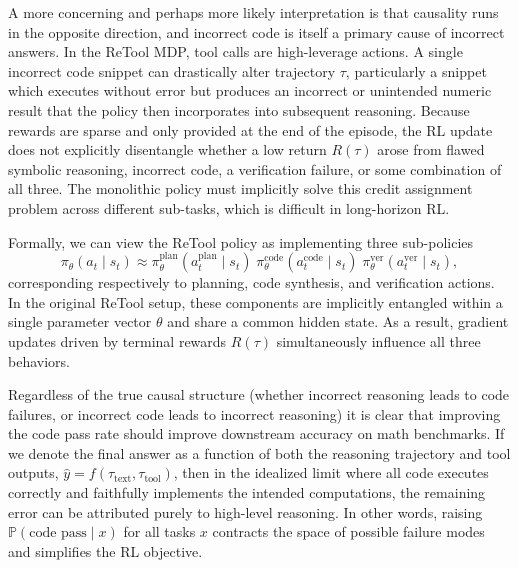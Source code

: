 \documentclass{article}
\begin{document}
A more concerning and perhaps more likely interpretation is that causality runs in the opposite direction, 
and incorrect code is itself a primary cause of incorrect answers. In the ReTool MDP, 
tool calls are high-leverage actions. A single incorrect code snippet can drastically 
alter trajectory $\tau$, particularly a snippet which executes without error but 
produces an incorrect or unintended numeric result that the policy then incorporates 
into subsequent reasoning. Because rewards are sparse and only provided at the end of 
the episode, the RL update does not explicitly disentangle whether a low return $R(\tau)$
arose from flawed symbolic reasoning, incorrect code, a verification failure, or 
some combination of all three. The monolithic policy must implicitly solve this 
credit assignment problem across different sub-tasks, which is 
difficult in long-horizon RL.

Formally, we can view the ReTool policy as implementing three sub-policies
\begin{equation}
  \pi_\theta(a_t \mid s_t) 
  \approx 
  \pi_\theta^{\text{plan}}(a_t^{\text{plan}} \mid s_t)
  \;\pi_\theta^{\text{code}}(a_t^{\text{code}} \mid s_t)
  \;\pi_\theta^{\text{ver}}(a_t^{\text{ver}} \mid s_t),
\end{equation}
corresponding respectively to planning, code synthesis, and verification actions. 
In the original ReTool setup, these components are implicitly entangled within a 
single parameter vector $\theta$ and share a common hidden state. As a result, 
gradient updates driven by terminal rewards $R(\tau)$ simultaneously influence 
all three behaviors.

Regardless of the true causal structure (whether incorrect reasoning leads 
to code failures, or incorrect code leads to incorrect reasoning) it is clear 
that improving the code pass rate should improve downstream 
accuracy on math benchmarks. If we denote the final answer as a function of 
both the reasoning trajectory and tool outputs, 
$\hat{y} = f(\tau_{\text{text}}, \tau_{\text{tool}})$, then in the idealized 
limit where all code executes correctly and faithfully implements the intended 
computations, the remaining error can be attributed purely to high-level 
reasoning. In other words, raising 
$\mathbb{P}(\text{code pass} \mid x)$ for all tasks $x$ contracts the space of 
possible failure modes and simplifies the RL objective.
\end{document}
